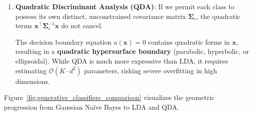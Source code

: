 \begin{enumerate}
  The log-odds reduces to a strictly \textbf{linear affine function of $\mathbf{x}$}:
  \begin{equation}
  a(\mathbf{x}) = \mathbf{w}^\top \mathbf{x} + w_0,
  \label{eq:lda_linear_form}
  \end{equation}
  where:
  \begin{equation}
  \mathbf{w} \triangleq \boldsymbol{\Sigma}^{-1}(\boldsymbol{\mu}_1 - \boldsymbol{\mu}_0), \qquad w_0 \triangleq -\frac{1}{2}\boldsymbol{\mu}_1^\top \boldsymbol{\Sigma}^{-1}\boldsymbol{\mu}_1 + \frac{1}{2}\boldsymbol{\mu}_0^\top \boldsymbol{\Sigma}^{-1}\boldsymbol{\mu}_0 + \ln \frac{P(y=1)}{P(y=0)}.
  \label{eq:lda_weights_definition}
  \end{equation}
  Inverting the log-odds ratio $a = \ln \frac{P}{1 - P}$ yields the posterior probability:
  \begin{equation}
  P(y = 1 \mid \mathbf{x}) = \frac{1}{1 + e^{-a(\mathbf{x})}} = \sigma(\mathbf{w}^\top \mathbf{x} + w_0).
  \label{eq:lda_logistic_sigmoid_posterior}
  \end{equation}
  \textbf{Linear Discriminant Analysis strictly produces a planar linear decision boundary ($\mathbf{w}^\top \mathbf{x} + w_0 = 0$) and directly recovers the logistic sigmoid functional form of Logistic Regression!}

  \item \textbf{Quadratic Discriminant Analysis (QDA)}:
  If we permit each class to possess its own distinct, unconstrained covariance matrix $\boldsymbol{\Sigma}_c$, the quadratic terms $\mathbf{x}^\top \boldsymbol{\Sigma}_c^{-1}\mathbf{x}$ do not cancel. 
  
  The decision boundary equation $a(\mathbf{x}) = 0$ contains quadratic forms in $\mathbf{x}$, resulting in a \textbf{quadratic hypersurface boundary} (parabolic, hyperbolic, or ellipsoidal). While QDA is much more expressive than LDA, it requires estimating $\mathcal{O}(K \cdot d^2)$ parameters, risking severe overfitting in high dimensions.
\end{enumerate}

Figure~\ref{fig:generative_classifiers_comparison} visualizes the geometric progression from Gaussian Naïve Bayes to LDA and QDA.

